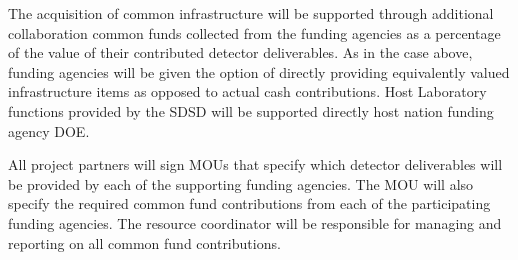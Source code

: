 The acquisition of common infrastructure will be supported through
additional collaboration common funds collected from the funding
agencies as a percentage of the value of their contributed detector
deliverables.  As in the case above, funding agencies will be given
the option of directly providing equivalently valued infrastructure
items as opposed to actual cash contributions.  Host Laboratory
functions provided by the SDSD will be supported directly host nation
funding agency DOE.

All project partners will sign MOUs that specify which detector
deliverables will be provided by each of the supporting funding
agencies.  The MOU will also specify the required common fund
contributions from each of the participating funding agencies.  The
 resource coordinator will be responsible for managing and
reporting on all common fund contributions.
